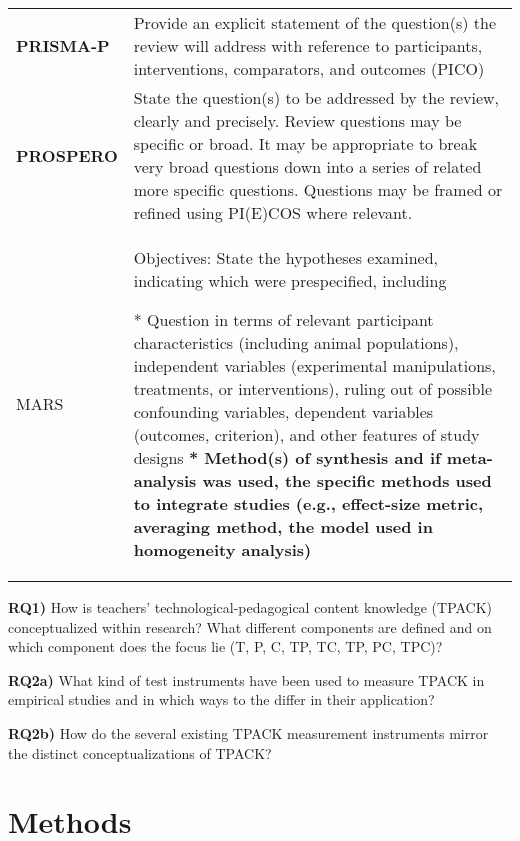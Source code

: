 \documentclass[
]{article}
\begin{document}
\hypertarget{rq}{}
\begin{collapse}

\begin{table}[H]
\centering
\begin{tabular}{>{}l|l}
\hline
\cellcolor[HTML]{ececec}{source} & \cellcolor[HTML]{ececec}{description}\\
\hline
\textbf{PRISMA-P} & Provide an explicit statement of the question(s) the review will address with reference to participants, interventions, comparators, and outcomes (PICO)\\
\hline
\textbf{PROSPERO} & State the question(s) to be addressed by the review, clearly and precisely. Review questions may be specific or broad. It may be appropriate to break very broad questions down into a series of related more specific questions. Questions may be framed or refined using PI(E)COS where relevant.\\
\hline
MARS & Objectives: State the hypotheses examined, indicating which were prespecified, including

* Question in terms of relevant participant characteristics (including animal populations), independent variables (experimental manipulations, treatments, or interventions), ruling out of possible confounding variables, dependent variables (outcomes, criterion), and other features of study designs
\textbf{* Method(s) of synthesis and if meta-analysis was used, the specific methods used to integrate studies (e.g., effect-size metric, averaging method, the model used in homogeneity analysis)}\\
\hline
\end{tabular}
\end{table}

\end{collapse}

\textbf{RQ1)} How is teachers' technological-pedagogical content
knowledge (TPACK) conceptualized within research? What different
components are defined and on which component does the focus lie (T, P,
C, TP, TC, TP, PC, TPC)?

\textbf{RQ2a)} What kind of test instruments have been used to measure
TPACK in empirical studies and in which ways to the differ in their
application?

\textbf{RQ2b)} How do the several existing TPACK measurement instruments
mirror the distinct conceptualizations of TPACK?

\hypertarget{methods}{%
\section{Methods}\label{methods}}
\end{document}

